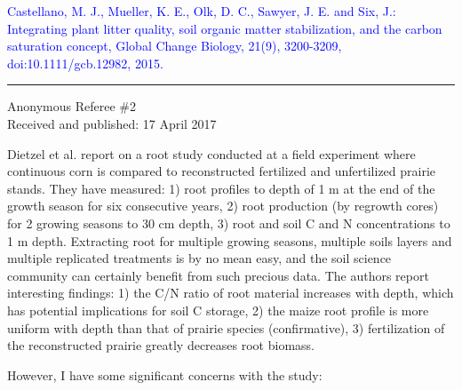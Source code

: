 \documentclass[]{article}
\begin{document}
\textcolor{blue}{Castellano, M. J., Mueller, K. E., Olk, D. C., Sawyer, J. E. and Six, J.: Integrating plant litter quality, soil organic matter stabilization, and the carbon saturation concept, Global Change Biology, 21(9), 3200-3209, doi:10.1111/gcb.12982, 2015.}

\begin{center}\rule{0.5\linewidth}{\linethickness}\end{center}

Anonymous Referee \#2\\
Received and published: 17 April 2017

Dietzel et al. report on a root study conducted at a field experiment
where continuous corn is compared to reconstructed fertilized and
unfertilized prairie stands. They have measured: 1) root profiles to
depth of 1 m at the end of the growth season for six consecutive years,
2) root production (by regrowth cores) for 2 growing seasons to 30 cm
depth, 3) root and soil C and N concentrations to 1 m depth. Extracting
root for multiple growing seasons, multiple soils layers and multiple
replicated treatments is by no mean easy, and the soil science community
can certainly benefit from such precious data. The authors report
interesting findings: 1) the C/N ratio of root material increases with
depth, which has potential implications for soil C storage, 2) the maize
root profile is more uniform with depth than that of prairie species
(confirmative), 3) fertilization of the reconstructed prairie greatly
decreases root biomass.

However, I have some significant concerns with the study:
\end{document}
